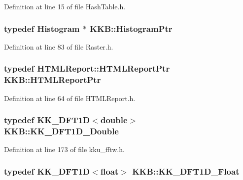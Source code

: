 Definition at line 15 of file Hash\+Table.\+h.

\subsubsection[{\texorpdfstring{Histogram\+Ptr}{HistogramPtr}}]{\setlength{\rightskip}{0pt plus 5cm}typedef {\bf Histogram} $\ast$ {\bf K\+K\+B\+::\+Histogram\+Ptr}}\hypertarget{namespace_k_k_b_a48b9611558f2c43f7ee877adb475b286}{}\label{namespace_k_k_b_a48b9611558f2c43f7ee877adb475b286}


Definition at line 83 of file Raster.\+h.

\subsubsection[{\texorpdfstring{H\+T\+M\+L\+Report\+Ptr}{HTMLReportPtr}}]{\setlength{\rightskip}{0pt plus 5cm}typedef {\bf H\+T\+M\+L\+Report\+::\+H\+T\+M\+L\+Report\+Ptr} {\bf K\+K\+B\+::\+H\+T\+M\+L\+Report\+Ptr}}\hypertarget{namespace_k_k_b_a9794ab43b4b17d680dd505d0f2550c92}{}\label{namespace_k_k_b_a9794ab43b4b17d680dd505d0f2550c92}


Definition at line 64 of file H\+T\+M\+L\+Report.\+h.

\subsubsection[{\texorpdfstring{K\+K\+\_\+\+D\+F\+T1\+D\+\_\+\+Double}{KK_DFT1D_Double}}]{\setlength{\rightskip}{0pt plus 5cm}typedef {\bf K\+K\+\_\+\+D\+F\+T1D}$<$double$>$ {\bf K\+K\+B\+::\+K\+K\+\_\+\+D\+F\+T1\+D\+\_\+\+Double}}\hypertarget{namespace_k_k_b_a9f9fb078a5aaeb09741729807bc85c14}{}\label{namespace_k_k_b_a9f9fb078a5aaeb09741729807bc85c14}


Definition at line 173 of file kku\+\_\+fftw.\+h.

\subsubsection[{\texorpdfstring{K\+K\+\_\+\+D\+F\+T1\+D\+\_\+\+Float}{KK_DFT1D_Float}}]{\setlength{\rightskip}{0pt plus 5cm}typedef {\bf K\+K\+\_\+\+D\+F\+T1D}$<$float$>$ {\bf K\+K\+B\+::\+K\+K\+\_\+\+D\+F\+T1\+D\+\_\+\+Float}}\hypertarget{namespace_k_k_b_a34ec4e0146fdb71ad05eab5ef0461f86}{}\label{namespace_k_k_b_a34ec4e0146fdb71ad05eab5ef0461f86}


